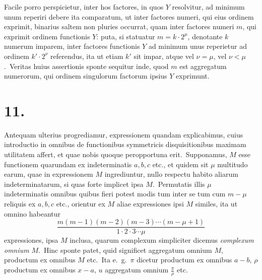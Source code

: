 \documentclass[12pt,a4paper]{article}
\theoremstyle{plain}
\begin{document}
Facile porro perspicietur, inter hos factores, in quos $Y$ resolvitur, ad minimum unum reperiri debere ita comparatum, ut inter factores numeri, qui eius
ordinem exprimit, binarius saltem non pluries occurrat, quam inter factores numeri $m$, qui exprimit ordinem functionis $Y$: puta, si statuatur $m = k \cdot 2^\mu$, denotante $k$ numerum imparem, inter factores functionis $Y$ ad minimum unus reperietur ad ordinem $k' \cdot 2^\nu$ referendus, ita ut etiam $k'$ sit impar, atque vel $\nu = \mu$,
vel $\nu < \mu$.\ Veritas huius assertionis sponte sequitur inde, quod $m$ est aggregatum numerorum, qui ordinem singulorum factorum ipsius $Y$ exprimunt.

\section*{11.}

Antequam ulterius progrediamur, expressionem quandam explicabimus, cuius introductio in omnibus de functionibus symmetricis disquisitionibus maximam
utilitatem affert, et quae nobis quoque peropportuna erit.\ Supponamus, $M$ esse
functionem quarundam ex indeterminatis $a, b, c$ etc., et quidem sit $\mu$ multitudo
earum, quae in expressionem $M$ ingrediuntur, nullo respectu habito aliarum indeterminatarum, si quas forte implicet ipsa $M$.\ Permutatis illis $\mu$ indeterminatis omnibus quibus fieri potest modis tum inter se tum cum $m - \mu$ reliquis ex
$a, b, c$ etc., orientur ex $M$ aliae expressiones ipsi $M$ similes, ita ut omnino habeantur
\[
\frac{m(m-1)(m-2)(m-3) \cdots (m-\mu+1)}{1 \cdot 2 \cdot 3 \cdots \mu}
\]
expressiones, ipsa $M$ inclusa, quarum complexum simpliciter dicemus \textit{complexum omnium} $M$.\ Hinc sponte patet, quid significet aggregatum omnium $M$, productum ex omnibus $M$ etc.\ Ita e.\ g.\ $\pi$ dicetur productum ex omnibus $a-b$,
$\rho$ productum ex omnibus $x-a$, $u$ aggregatum omnium $\frac{\pi}{\rho}$ etc.
\end{document}
